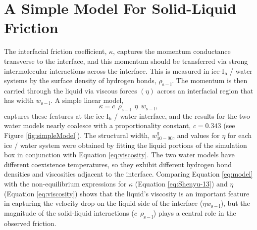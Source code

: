 \section{A Simple Model For Solid-Liquid Friction}
The interfacial friction coefficient, $\kappa$, captures the momentum
conductance transverse to the interface, and this momentum should be
transferred via strong intermolecular interactions across the
interface. This is measured in ice-I$_\mathrm{h}$ / water systems by
the surface density of hydrogen bonds, $\rho_\mathrm{s-l}$.  The
momentum is then carried through the liquid via viscous forces
$(\eta)$ across an interfacial region that has width
$w_\mathrm{s-l}$. A simple linear model,
\begin{equation}
  \kappa = c~~\rho_\mathrm{s-l}~~\eta~~w_\mathrm{s-l},
\label{eq:model}
\end{equation}
captures these features at the ice-I$_\mathrm{h}$ / water interface,
and the results for the two water models nearly coalesce with a
proportionality constant, $c = 0.343$ (see
Figure \ref{fig:simpleModel}).  The structural width,
$w_\mathrm{10-90}^{q}$, and values for $\eta$ for each ice / water
system were obtained by fitting the liquid portions of the simulation
box in conjunction with Equation \eqref{eq:viscosity}.  The two water
models have different coexistence temperatures, so they exhibit
different hydrogen bond densities and viscosities adjacent to the
interface.  Comparing Equation \eqref{eq:model} with the non-equilibrium
expressions for $\kappa$ (Equation \eqref{eq:Shenyu-13}) and $\eta$
(Equation \eqref{eq:viscosity}) shows that the liquid's viscosity is an
important feature in capturing the velocity drop on the liquid side of
the interface ($\eta w_\mathrm{s-l}$), but the magnitude of the
solid-liquid interactions ($c~~\rho_\mathrm{s-l}$) plays a central
role in the observed friction.

